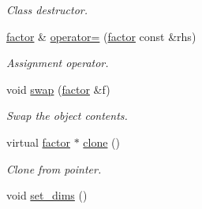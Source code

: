 \begin{DoxyCompactItemize}
\begin{DoxyCompactList}\small\item\em Class destructor. \end{DoxyCompactList}\item 
\hyperlink{classmerlin_1_1factor}{factor} \& \hyperlink{classmerlin_1_1factor_a5bb09d09b5141777be8bbf210b071516}{operator=} (\hyperlink{classmerlin_1_1factor}{factor} const \&rhs)
\begin{DoxyCompactList}\small\item\em Assignment operator. \end{DoxyCompactList}\item 
void \hyperlink{classmerlin_1_1factor_abeb2ea39caa01ef6b94b9e796484b78a}{swap} (\hyperlink{classmerlin_1_1factor}{factor} \&f)
\begin{DoxyCompactList}\small\item\em Swap the object contents. \end{DoxyCompactList}\item 
virtual \hyperlink{classmerlin_1_1factor}{factor} $\ast$ \hyperlink{classmerlin_1_1factor_a789b7a448eda0c25be234fed47ca5b95}{clone} ()
\begin{DoxyCompactList}\small\item\em Clone from pointer. \end{DoxyCompactList}\item 
void \hyperlink{classmerlin_1_1factor_a94727058eaffbe0a7a3e6dceb4b44498}{set\+\_\+dims} ()\hypertarget{classmerlin_1_1factor_a94727058eaffbe0a7a3e6dceb4b44498}{}\label{classmerlin_1_1factor_a94727058eaffbe0a7a3e6dceb4b44498}


\end{DoxyCompactItemize}
